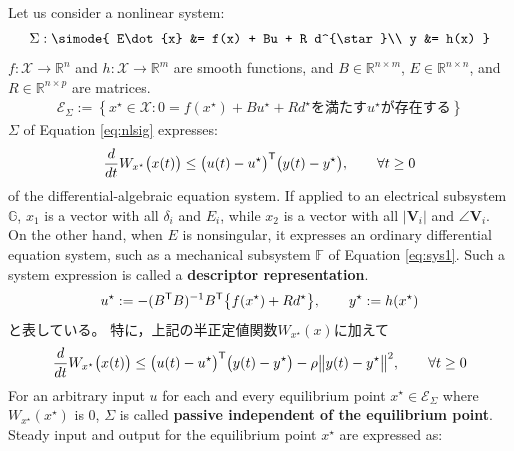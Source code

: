 \documentclass[graybox, envcountchap]{svmult}
\begin{document}
\begin{定義}\label{def:eipassive}
Let us consider a nonlinear system:
\begin{align}\label{eq:nlsig}
\Sigma: \simode{
E\dot{x} &= f(x) + Bu + R d^{\star}\\
y &= h(x)
}
\end{align}
$f:\mathcal{X} \rightarrow \mathbb{R}^{n}$ and $h:\mathcal{X} \rightarrow \mathbb{R}^{m}$ are smooth functions, and $B \in \mathbb{R}^{n\times m}$, $E \in \mathbb{R}^{n\times n}$, and $R \in \mathbb{R}^{n\times p}$ are matrices.
\begin{align*}%
\mathcal{E}_{\Sigma} :=
\left\{
x^{\star} \in \mathcal{X}: 
\mbox{$0 = f(x^{\star})+B u^{\star}+ R d^{\star}$を満たす$u^{\star}$が存在する}
\right\}
\end{align*}
$\Sigma$ of Equation \ref{eq:nlsig} expresses:
\begin{align*}%
\frac{d}{dt} W_{x^{\star}} \bigl( x(t) \bigr) \leq \bigl(u(t)-u^{\star}\bigr)^{\sf T} \bigl(y(t)-y^{\star}\bigr)
,\qquad
\forall t \geq 0
\end{align*}
of the differential-algebraic equation system.
If applied to an electrical subsystem $\mathds{G}$, $x_1$ is a vector with all $\delta_i$ and $E_i$, while $x_2$ is a vector with all $|\bm{V}_i|$ and $\angle \bm{V}_i$.
On the other hand, when $E$ is nonsingular, it expresses an ordinary differential equation system, such as a mechanical subsystem $\mathds{F}$ of Equation \ref{eq:sys1}.
Such a system expression is called a \textbf{descriptor representation}.
\begin{align*}%
u^{\star} := -(B^{\sf T}B)^{-1}B^{\sf T} \bigl\{f(x^{\star}) + R d^{\star} \bigr\}
,\qquad
y^{\star} := h(x^{\star}) 
\end{align*}
と表している。
特に，上記の半正定値関数$W_{x^{\star}}(x)$に加えて
\begin{align*}%
\frac{d}{dt} W_{x^{\star}} \bigl( x(t) \bigr) \leq \bigl(u(t)-u^{\star}\bigr)^{\sf T} \bigl(y(t)-y^{\star}\bigr)
-\rho \bigl\|y(t)-y^{\star} \bigr\|^2
,\qquad
\forall t \geq 0
\end{align*}
For an arbitrary input $u $ for each and every equilibrium point $x^{\star} \in \mathcal{E}_{\Sigma}$ where $W_{x^{\star}} (x^{\star})$ is 0, $\Sigma$ is called \textbf{passive independent of the equilibrium point}.
Steady input and output for the equilibrium point $x^{\star}$ are expressed as:
\end{定義}
\end{document}
